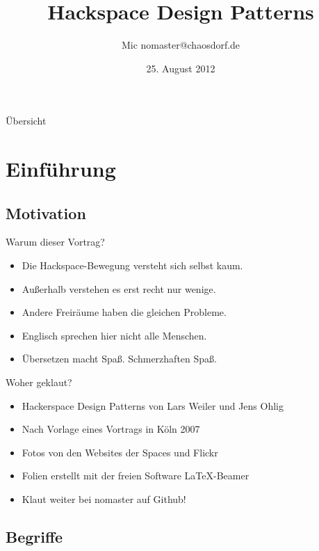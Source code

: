 \documentclass[aspectratio=43]{beamer}
\title{Hackspace Design Patterns}
\author[Mic]{Mic \flq nomaster@chaosdorf.de\frq}
\institute[chaosdorf]{Chaos Computer Club Düsseldorf / Chaosdorf e.V.}
\date[]{25. August 2012}
\begin{document}
  \begin{frame}
    \titlepage
  \end{frame}

  \begin{frame}{Übersicht}
    \tableofcontents
  \end{frame}

  \section{Einführung}

  \subsection{Motivation}

  \begin{frame}{Warum dieser Vortrag?}
    \begin{itemize}
      \item Die Hackspace-Bewegung versteht sich selbst kaum.
      \pause
      \item Außerhalb verstehen es erst recht nur wenige.
      \pause
      \item Andere Freiräume haben die gleichen Probleme.
      \pause
      \item Englisch sprechen hier nicht alle Menschen.
      \pause
      \item Übersetzen macht Spaß. Schmerzhaften Spaß.
    \end{itemize}
  \end{frame}

  \begin{frame}{Woher geklaut?}
    \begin{itemize}
      \item Hackerspace Design Patterns von Lars Weiler und Jens Ohlig
      \item Nach Vorlage eines Vortrags in Köln 2007
      \pause
      \item Fotos von den Websites der Spaces und Flickr
      \item Folien erstellt mit der freien Software \LaTeX-Beamer
      \pause
      \item Klaut weiter bei nomaster auf Github!
    \end{itemize}
  \end{frame}

  \subsection{Begriffe}
\end{document}

